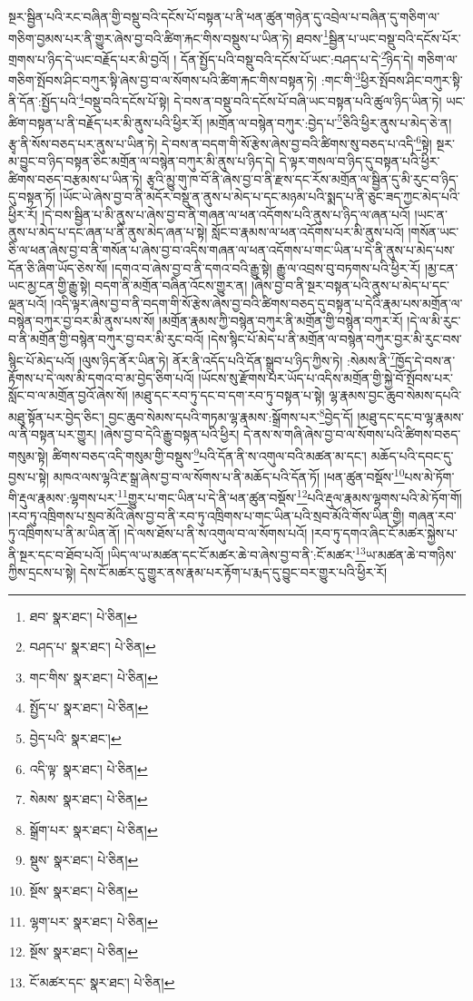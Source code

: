 སྔར་སྦྱིན་པའི་རང་བཞིན་གྱི་བསྡུ་བའི་དངོས་པོ་བསྟན་པ་ནི་ཕན་ཚུན་གཉེན་དུ་འབྲེལ་པ་བཞིན་དུ་གཅིག་ལ་གཅིག་བྱམས་པར་ནི་གྱུར་ཞེས་བྱ་བའི་ཚིག་རྐང་གིས་བསྡུས་པ་ཡིན་ཏེ། ཐབས་\footnote{ཐབ་  སྣར་ཐང་།  པེ་ཅིན། }སྦྱིན་པ་ཡང་བསྡུ་བའི་དངོས་པོར་གྲགས་པ་ཉིད་དེ་ཡང་བརྗོད་པར་མི་བྱའོ། །
དོན་སྤྱོད་པའི་བསྡུ་བའི་དངོས་པོ་ཡང་:བཤད་པ་དེ་\footnote{བཤད་པ་  སྣར་ཐང་།  པེ་ཅིན། }ཉིད་དེ། གཅིག་ལ་གཅིག་སྤོབས་ཤིང་བཀུར་སྟི་ཞེས་བྱ་བ་ལ་སོགས་པའི་ཚིག་རྐང་གིས་བསྟན་ཏེ། :གང་གི་\footnote{གང་གིས་  སྣར་ཐང་།  པེ་ཅིན། }ཕྱིར་སྤོབས་ཤིང་བཀུར་སྟི་ནི་དོན་:སྤྱོད་པའི་\footnote{སྤྱོད་པ་  སྣར་ཐང་།  པེ་ཅིན། }བསྡུ་བའི་དངོས་པོ་སྟེ། དེ་བས་ན་བསྡུ་བའི་དངོས་པོ་བཞི་ཡང་བསྟན་པའི་ཚུལ་ཉིད་ཡིན་ཏེ། ཡང་ཚིག་བསྟན་པ་ནི་བརྗོད་པར་མི་ནུས་པའི་ཕྱིར་རོ། །མགྲོན་ལ་བསྙེན་བཀུར་:བྱེད་པ་\footnote{བྱེད་པའི་  སྣར་ཐང་། }ཅིའི་ཕྱིར་ནུས་པ་མེད་ཅེ་ན། རྩྭ་ནི་སོས་བཅད་པར་ནུས་པ་ཡིན་ཏེ། དེ་བས་ན་བདག་གི་སོ་རྩེས་ཞེས་བྱ་བའི་ཚིགས་སུ་བཅད་པ་འདི་\footnote{འདི་ལྟ་  སྣར་ཐང་།  པེ་ཅིན། }སྟེ། སྔར་མ་བྱུང་བ་ཉིད་བསྟན་ཅིང་མགྲོན་ལ་བསྙེན་བཀུར་མི་ནུས་པ་ཉིད་དེ། དེ་ལྟར་གསལ་བ་ཉིད་དུ་བསྟན་པའི་ཕྱིར་ཚིགས་བཅད་བརྩམས་པ་ཡིན་ཏེ། རྩྭའི་མྱུ་གུ་ཁ་བོ་ནི་ཞེས་བྱ་བ་ནི་རྫས་དང་རོས་མགྲོན་ལ་སྦྱིན་དུ་མི་རུང་བ་ཉིད་དུ་བསྟན་ཏོ། །ཡོང་ཡེ་ཞེས་བྱ་བ་ནི་མདོར་བསྡུ་ན་ནུས་པ་མེད་པ་དང་མཉམ་པའི་སྨད་པ་ནི་ཅུང་ཟད་ཀྱང་མེད་པའི་ཕྱིར་རོ། །དེ་བས་སྦྱིན་པ་མི་ནུས་པ་ཞེས་བྱ་བ་ནི་གཞན་ལ་ཕན་འདོགས་པའི་ནུས་པ་ཉིད་ལ་ཞན་པའོ། །ཡང་ན་ནུས་པ་མེད་པ་དང་ཞན་པ་ནི་ནུས་མེད་ཞན་པ་སྟེ། སློང་བ་རྣམས་ལ་ཕན་འདོགས་པར་མི་ནུས་པའོ། །གསོན་ཡང་ཅི་ལ་ཕན་ཞེས་བྱ་བ་ནི་གསོན་པ་ཞེས་བྱ་བ་འདིས་གཞན་ལ་ཕན་འདོགས་པ་གང་ཡིན་པ་དེ་ནི་ནུས་པ་མེད་པས་དོན་ཅི་ཞིག་ཡོད་ཅེས་སོ། །དགའ་བ་ཞེས་བྱ་བ་ནི་དགའ་བའི་རྒྱུ་སྟེ། རྒྱུ་ལ་འབྲས་བུ་བཏགས་པའི་ཕྱིར་རོ། །མྱ་ངན་ཡང་མྱ་ངན་གྱི་རྒྱུ་སྟེ། བདག་ནི་མགྲོན་བཞིན་འོངས་གྱུར་ན། །ཞེས་བྱ་བ་ནི་སྔར་བསྟན་པའི་ནུས་པ་མེད་པ་དང་ལྡན་པའོ། །འདི་ལྟར་ཞེས་བྱ་བ་ནི་བདག་གི་སོ་རྩེས་ཞེས་བྱ་བའི་ཚིགས་བཅད་དུ་བསྟན་པ་དེའི་རྣམ་པས་མགྲོན་ལ་བསྙེན་བཀུར་བྱ་བར་མི་ནུས་པས་སོ། །མགྲོན་རྣམས་ཀྱི་བསྙེན་བཀུར་ནི་མགྲོན་གྱི་བསྙེན་བཀུར་རོ། །དེ་ལ་མི་རུང་བ་ནི་མགྲོན་གྱི་བསྙེན་བཀུར་བྱ་བར་མི་རུང་བའོ། །དེས་སྙིང་པོ་མེད་པ་ནི་མགྲོན་ལ་བསྙེན་བཀུར་བྱར་མི་རུང་བས་སྙིང་པོ་མེད་པའོ། །ལུས་ཉིད་ནོར་ཡིན་ཏེ། ནོར་ནི་འདོད་པའི་དོན་སྒྲུབ་པ་ཉིད་ཀྱིས་ཏེ། :སེམས་ནི་\footnote{སེམས་  སྣར་ཐང་།  པེ་ཅིན། }ཁྱོད་དེ་བས་ན་རྟོགས་པ་དེ་ལས་མི་དགའ་བ་མ་བྱེད་ཅིག་པའོ། །ཡོངས་སུ་རྫོགས་པར་ཡོད་པ་འདིས་མགྲོན་གྱི་སྐྱེ་བོ་སྤོབས་པར་སློང་བ་ལ་མགྲོན་བྱའོ་ཞེས་སོ། །མཐུ་དང་རབ་ཏུ་དང་བ་དག་རབ་ཏུ་བསྟན་པ་སྟེ། ལྷ་རྣམས་བྱང་ཆུབ་སེམས་དཔའི་མཐུ་སྟོན་པར་བྱེད་ཅིང་། བྱང་ཆུབ་སེམས་དཔའི་གཏམ་ལྷ་རྣམས་:སྒྲོགས་པར་\footnote{སྒྲོག་པར་  སྣར་ཐང་།  པེ་ཅིན། }བྱེད་དོ། །མཐུ་དང་དང་བ་ལྷ་རྣམས་ལ་ནི་བསྟན་པར་གྱུར། །ཞེས་བྱ་བ་དེའི་རྒྱུ་བསྟན་པའི་ཕྱིར། དེ་ནས་ས་གཞི་ཞེས་བྱ་བ་ལ་སོགས་པའི་ཚིགས་བཅད་གསུམ་སྟེ། ཚིགས་བཅད་འདི་གསུམ་གྱི་བསྡུས་\footnote{སྡུས་  སྣར་ཐང་།  པེ་ཅིན། }པའི་དོན་ནི་ས་འགུལ་བའི་མཚན་མ་དང་། མཆོད་པའི་དབང་དུ་བྱས་པ་སྟེ། མཁའ་ལས་ལྷའི་རྔ་སྒྲ་ཞེས་བྱ་བ་ལ་སོགས་པ་ནི་མཆོད་པའི་དོན་ཏོ། །ཕན་ཚུན་བསྡོས་\footnote{སྔོས་  སྣར་ཐང་།  པེ་ཅིན། }པས་མེ་ཏོག་གི་རྡུལ་རྣམས་:ལྷགས་པར་\footnote{ལྷག་པར་  སྣར་ཐང་།  པེ་ཅིན། }གྱུར་པ་གང་ཡིན་པ་དེ་ནི་ཕན་ཚུན་བསྡོས་\footnote{སྔོས་  སྣར་ཐང་།  པེ་ཅིན། }པའི་རྡུལ་རྣམས་ལྷགས་པའི་མེ་ཏོག་གོ། །རབ་ཏུ་འཁྲིགས་པ་སྲབ་མོའི་ཞེས་བྱ་བ་ནི་རབ་ཏུ་འཁྲིགས་པ་གང་ཡིན་པའི་སྲབ་མོའི་གོས་ཡིན་གྱི། གཞན་རབ་ཏུ་འཁྲིགས་པ་ནི་མ་ཡིན་ནོ། །དེ་ལས་ཐོས་པ་ནི་ས་འགུལ་བ་ལ་སོགས་པའོ། །རབ་ཏུ་དགའ་ཞིང་ངོ་མཚར་སྐྱེས་པ་ནི་སྔར་དང་བ་ཐོབ་པའོ། །ཡིད་ལ་ཡ་མཚན་དང་ངོ་མཚར་ཆེ་བ་ཞེས་བྱ་བ་ནི་:ངོ་མཚར་\footnote{ངོ་མཚར་དང་  སྣར་ཐང་།  པེ་ཅིན། }ཡ་མཚན་ཆེ་བ་གཉིས་ཀྱིས་དྲངས་པ་སྟེ། དེས་ངོ་མཚར་དུ་གྱུར་ནས་རྣམ་པར་རྟོག་པ་རྨད་དུ་བྱུང་བར་གྱུར་པའི་ཕྱིར་རོ། 